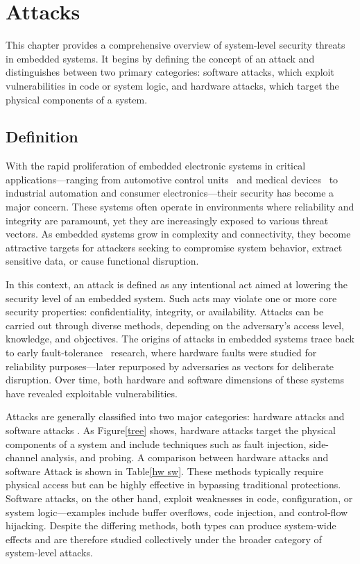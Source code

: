 
\clearemptydoublepage
\chapter{Attacks}
This chapter provides a comprehensive overview of system-level security threats in embedded systems. It begins by defining the concept of an attack and distinguishes between two primary categories: software attacks, which exploit vulnerabilities in code or system logic, and hardware attacks, which target the physical components of a system. 
\section{Definition}
With the rapid proliferation of embedded electronic systems in critical applications—ranging from automotive control units~\cite{7917080} and medical devices~\cite{4431854} to industrial automation and consumer electronics—their security has become a major concern. These systems often operate in environments where reliability and integrity are paramount, yet they are increasingly exposed to various threat vectors. As embedded systems grow in complexity and connectivity, they become attractive targets for attackers seeking to compromise system behavior, extract sensitive data, or cause functional disruption.

In this context, an attack is defined as any intentional act aimed at lowering the security level of an embedded system. Such acts may violate one or more core security properties: confidentiality, integrity, or availability. Attacks can be carried out through diverse methods, depending on the adversary’s access level, knowledge, and objectives. The origins of attacks in embedded systems trace back to early fault-tolerance~\cite{9684471} research, where hardware faults were studied for reliability purposes—later repurposed by adversaries as vectors for deliberate disruption. Over time, both hardware and software dimensions of these systems have revealed exploitable vulnerabilities.

Attacks are generally classified into two major categories: hardware attacks \cite{6856140} and software attacks \cite{6832045}. As Figure\ref{tree} shows, hardware attacks target the physical components of a system and include techniques such as fault injection, side-channel analysis, and probing. A comparison between hardware attacks and software Attack is shown in Table\ref{hw sw}. These methods typically require physical access but can be highly effective in bypassing traditional protections. Software attacks, on the other hand, exploit weaknesses in code, configuration, or system logic—examples include buffer overflows, code injection, and control-flow hijacking. Despite the differing methods, both types can produce system-wide effects and are therefore studied collectively under the broader category of system-level attacks.

